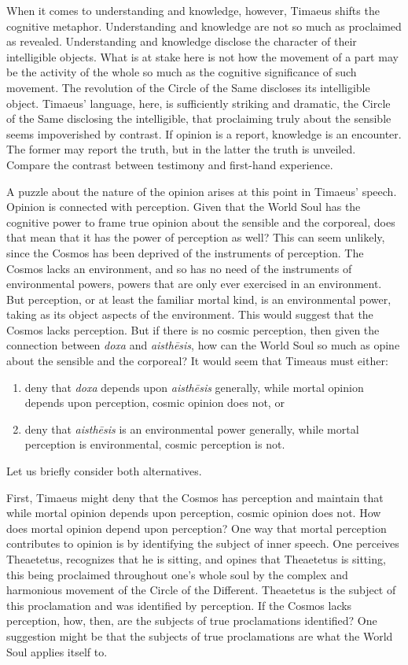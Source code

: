 When it comes to understanding and knowledge, however, Timaeus shifts the cognitive metaphor. Understanding and knowledge are not so much as proclaimed as revealed. Understanding and knowledge disclose the character of their intelligible objects. What is at stake here is not how the movement of a part may be the activity of the whole so much as the cognitive significance of such movement. The revolution of the Circle of the Same discloses its intelligible object. Timaeus' language, here, is sufficiently striking and dramatic, the Circle of the Same disclosing the intelligible, that proclaiming truly about the sensible seems impoverished by contrast. If opinion is a report, knowledge is an encounter. The former may report the truth, but in the latter the truth is unveiled. Compare the contrast between testimony and first-hand experience. 

A puzzle about the nature of the opinion arises at this point in Timaeus' speech. Opinion is connected with perception. Given that the World Soul has the cognitive power to frame true opinion about the sensible and the corporeal, does that mean that it has the power of perception as well? This can seem unlikely, since the Cosmos has been deprived of the instruments of perception. The Cosmos lacks an environment, and so has no need of the instruments of environmental powers, powers that are only ever exercised in an environment. But perception, or at least the familiar mortal kind, is an environmental power, taking as its object aspects of the environment. This would suggest that the Cosmos lacks perception. But if there is no cosmic perception, then given the connection between \emph{doxa} and \emph{aisthēsis}, how can the World Soul so much as opine about the sensible and the corporeal? It would seem that Timeaus must either:
\begin{enumerate}[(1)]
	\item deny that \emph{doxa} depends upon \emph{aisthēsis} generally, while mortal opinion depends upon perception, cosmic opinion does not, or
	\item deny that \emph{aisthēsis} is an environmental power generally, while mortal perception is environmental, cosmic perception is not. 
\end{enumerate}

Let us briefly consider both alternatives.

First, Timaeus might deny that the Cosmos has perception and maintain that while mortal opinion depends upon perception, cosmic opinion does not. How does mortal opinion depend upon perception? One way that mortal perception contributes to opinion is by identifying the subject of inner speech. One perceives Theaetetus, recognizes that he is sitting, and opines that Theaetetus is sitting, this being proclaimed throughout one's whole soul by the complex and harmonious movement of the Circle of the Different. Theaetetus is the subject of this proclamation and was identified by perception. If the Cosmos lacks perception, how, then, are the subjects of true proclamations identified? One suggestion might be that the subjects of true proclamations are what the World Soul applies itself to. 

